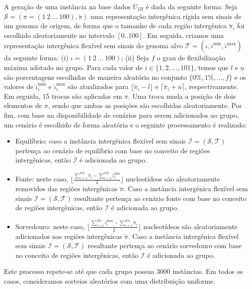 A geração de uma instância na base dados $U_{IR}$ é dada da seguinte forma: Seja $\mathcal{S} = (\pi =(1~2~\dots~100),\breve\pi)$ uma representação intergênica rígida sem sinais de um genoma de origem, de forma que o tamanho de cada região intergênica $\breve\pi_i$ foi escolhido aleatoriamente no intervalo $[0..100]$. Em seguida, criamos uma representação intergênica flexível sem sinais do genoma alvo $\mathcal{T} = (\iota, \breve\iota^{\min},\breve\iota^{\max})$ da seguinte forma: (i) $\iota =(1~2~\dots~100)$; (ii) Seja $f$ o grau de flexibilização máxima adotado no grupo. Para cada valor de $i \in \{1,2,\dots,101\}$, temos que $l$ e $u$ são porcentagens escolhidas de maneira aleatória no conjunto $\{0\%,1\%,\dots,f\}$ e os valores de $\breve\iota^{\min}_i$ e $\breve\iota^{\max}_i$ são atualizados para $\lfloor\breve\pi_i - l\rfloor$ e $\lceil\breve\pi_i + u\rceil$, respectivamente. Em seguida, 15 trocas são aplicadas em $\pi$. Uma troca muda a posição de dois elementos de $\pi$, sendo que ambas as posições são escolhidas aleatoriamente. Por fim, com base na disponibilidade de cenários para serem adicionados ao grupo, um cenário é escolhido de forma aleatória e o seguinte processamento é realizado:
\begin{itemize}
  \item Equilíbrio: caso a instância intergênica flexível sem sinais $\mathcal{I} = (\mathcal{S},\mathcal{T})$ pertença ao cenário de equilíbrio com base no conceito de regiões intergênicas, então $\mathcal{I}$ é adicionada ao grupo.
  \item Fonte: neste caso, $\lfloor\frac{\sum_{i = 1}^{101}\breve\pi_i - \sum_{i = 1}^{101}\breve\iota^{\min}_i}{2}\rfloor$ nucleotídeos são aleatoriamente removidos das regiões intergênicas $\breve\pi$. Caso a instância intergênica flexível sem sinais $\mathcal{I} = (\mathcal{S},\mathcal{T})$ resultante pertença ao cenário fonte com base no conceito de regiões intergênicas, então $\mathcal{I}$ é adicionada ao grupo.
  \item Sorvedouro: neste caso, $\lfloor\frac{\sum_{i = 1}^{101}\breve\iota^{\max}_i - \sum_{i = 1}^{101}\breve\pi_i}{2}\rfloor$ nucleotídeos são aleatoriamente adicionados nas regiões intergênicas $\breve\pi$. Caso a instância intergênica flexível sem sinais $\mathcal{I} = (\mathcal{S},\mathcal{T})$ resultante pertença ao cenário sorvedouro com base no conceito de regiões intergênicas, então $\mathcal{I}$ é adicionada ao grupo.
\end{itemize}
Este processo repete-se até que cada grupo possua 3000 instâncias. Em todos os casos, consideramos sorteios aleatórios com uma distribuição uniforme.

